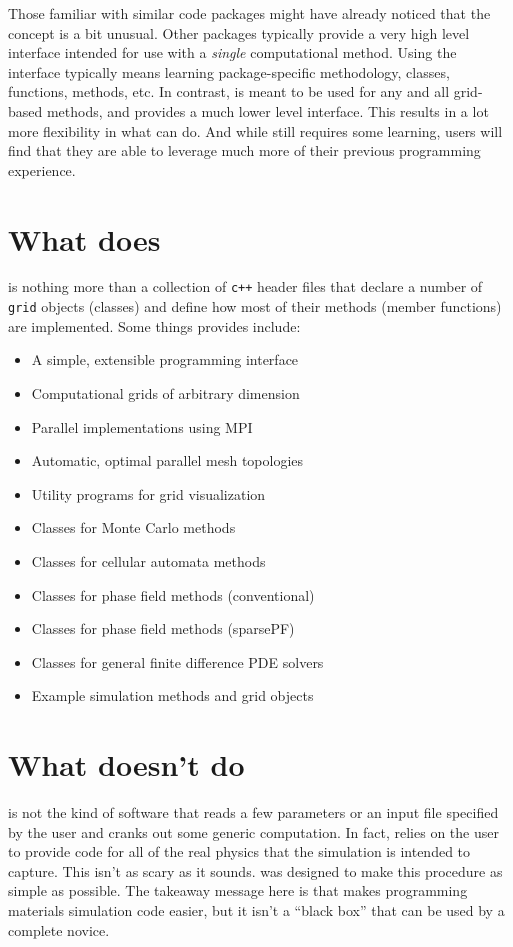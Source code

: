 Those familiar with similar code packages might have already noticed that the \MMSP concept is a bit unusual. Other packages typically provide a very high level interface intended for use with a {\em single} computational method.  Using the interface typically means learning package-specific methodology, classes, functions, methods, etc.  In contrast, \MMSP is meant to be used for any and all grid-based methods, and provides a much lower level interface.  This results in a lot more flexibility in what \MMSP can do.  And while \MMSP still requires some learning, users will find that they are able to leverage much more of their previous programming experience.

\section{What \MMSP does}
\MMSP is nothing more than a collection of {\tt c++} header files that declare a number of {\tt grid} objects (classes) and define how most of their methods (member functions) are implemented.  Some things \MMSP provides include:
\begin{itemize}
\item A simple, extensible programming interface
\item Computational grids of arbitrary dimension
\item Parallel implementations using MPI
\item Automatic, optimal parallel mesh topologies
\item Utility programs for grid visualization
\item Classes for Monte Carlo methods
\item Classes for cellular automata methods 
\item Classes for phase field methods (conventional)
\item Classes for phase field methods (sparsePF)
\item Classes for general finite difference PDE solvers
\item Example simulation methods and grid objects
\end{itemize}

\section{What \MMSP doesn't do}
\MMSP is not the kind of software that reads a few parameters or an input file specified by the user and cranks out some generic computation. In fact, \MMSP relies on the user to provide code for all of the real physics that the simulation is intended to capture. This isn't as scary as it sounds. \MMSP was designed to make this procedure as simple as possible. The takeaway message here is that \MMSP makes programming materials simulation code easier, but it isn't a ``black box'' that can be used by a complete novice.

